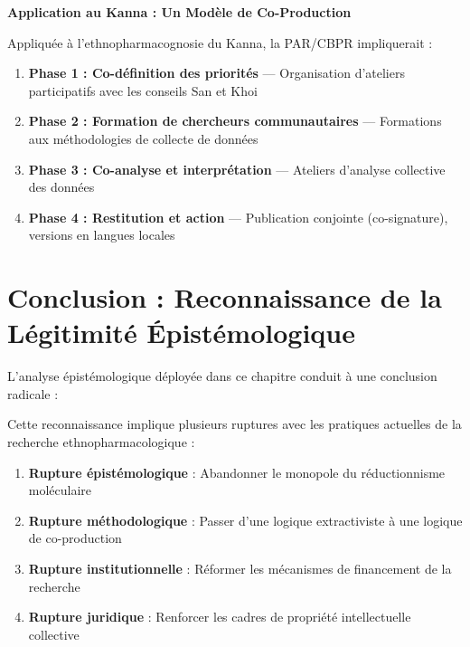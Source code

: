 \documentclass[12pt,a4paper]{report}
\begin{document}
\textbf{Application au Kanna : Un Modèle de Co-Production}

Appliquée à l'ethnopharmacognosie du Kanna, la PAR/CBPR impliquerait :

\begin{enumerate}
\item \textbf{Phase 1 : Co-définition des priorités} — Organisation d'ateliers participatifs avec les conseils San et Khoi
\item \textbf{Phase 2 : Formation de chercheurs communautaires} — Formations aux méthodologies de collecte de données
\item \textbf{Phase 3 : Co-analyse et interprétation} — Ateliers d'analyse collective des données
\item \textbf{Phase 4 : Restitution et action} — Publication conjointe (co-signature), versions en langues locales
\end{enumerate}

\section{Conclusion : Reconnaissance de la Légitimité Épistémologique}

L'analyse épistémologique déployée dans ce chapitre conduit à une conclusion radicale :

\begin{center}
\end{center}

Cette reconnaissance implique plusieurs ruptures avec les pratiques actuelles de la recherche ethnopharmacologique :

\begin{enumerate}
\item \textbf{Rupture épistémologique} : Abandonner le monopole du réductionnisme moléculaire
\item \textbf{Rupture méthodologique} : Passer d'une logique extractiviste à une logique de co-production
\item \textbf{Rupture institutionnelle} : Réformer les mécanismes de financement de la recherche
\item \textbf{Rupture juridique} : Renforcer les cadres de propriété intellectuelle collective
\end{enumerate}



\end{document}
